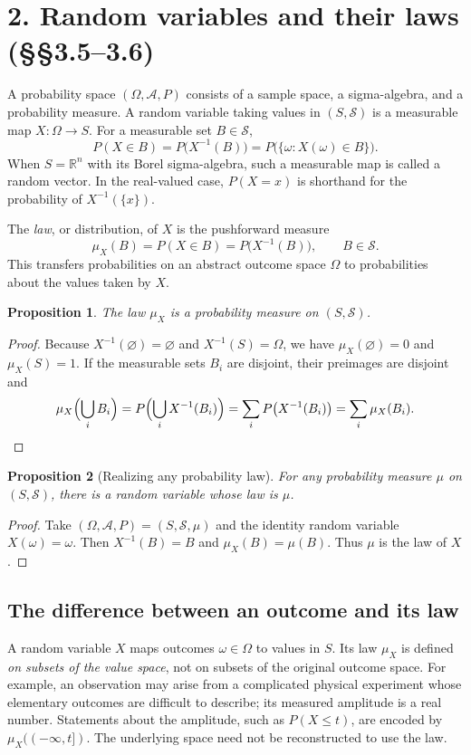 \documentclass[10pt,a4paper]{article}
\newtheorem{proposition}{Proposition}
\newcommand{\R}{\mathbb R}\newcommand{\Q}{\mathbb Q}\newcommand{\E}{\mathbb E}\newcommand{\B}{\mathcal B}
\begin{document}
\section*{2. Random variables and their laws (\S\S3.5--3.6)}
A probability space $(\Omega,\mathcal A,P)$ consists of a sample space, a sigma-algebra, and a probability measure. A random variable taking values in $(S,\mathcal S)$ is a measurable map $X:\Omega\to S$. For a measurable set $B\in\mathcal S$,
\[
P(X\in B)=P\bigl(X^{-1}(B)\bigr)
=P\bigl(\{\omega:X(\omega)\in B\}\bigr).
\]
When $S=\R^n$ with its Borel sigma-algebra, such a measurable map is called a random vector. In the real-valued case, $P(X=x)$ is shorthand for the probability of $X^{-1}(\{x\})$.

The \emph{law}, or distribution, of $X$ is the pushforward measure
\[
\mu_X(B)=P(X\in B)=P\bigl(X^{-1}(B)\bigr),\qquad B\in\mathcal S.
\]
This transfers probabilities on an abstract outcome space $\Omega$ to probabilities about the values taken by $X$.
\begin{proposition}
The law $\mu_X$ is a probability measure on $(S,\mathcal S)$.
\end{proposition}
\begin{proof}
Because $X^{-1}(\varnothing)=\varnothing$ and $X^{-1}(S)=\Omega$, we have $\mu_X(\varnothing)=0$ and $\mu_X(S)=1$. If the measurable sets $B_i$ are disjoint, their preimages are disjoint and
\[
\mu_X\Bigl(\bigcup_i B_i\Bigr)
=P\Bigl(\bigcup_i X^{-1}(B_i)\Bigr)
=\sum_i P\bigl(X^{-1}(B_i)\bigr)
=\sum_i\mu_X(B_i).
\]
\end{proof}
\begin{proposition}[Realizing any probability law]
For any probability measure $\mu$ on $(S,\mathcal S)$, there is a random variable whose law is $\mu$.
\end{proposition}
\begin{proof}
Take $(\Omega,\mathcal A,P)=(S,\mathcal S,\mu)$ and the identity random variable $X(\omega)=\omega$. Then $X^{-1}(B)=B$ and $\mu_X(B)=\mu(B)$. Thus $\mu$ is the law of \emph{$X$}.
\end{proof}


\subsection*{The difference between an outcome and its law}
A random variable $X$ maps outcomes $\omega\in\Omega$ to values in $S$. Its law $\mu_X$ is defined \emph{on subsets of the value space}, not on subsets of the original outcome space. For example, an observation may arise from a complicated physical experiment whose elementary outcomes are difficult to describe; its measured amplitude is a real number. Statements about the amplitude, such as $P(X\le t)$, are encoded by $\mu_X(( -\infty,t])$. The underlying space need not be reconstructed to use the law.
\end{document}
